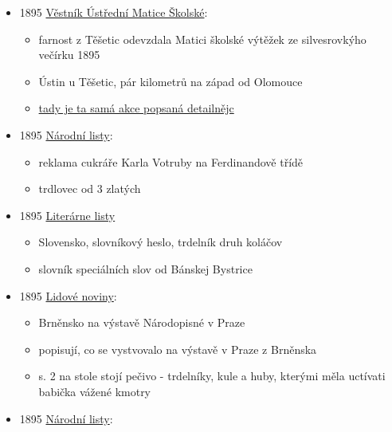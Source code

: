 \begin{itemize}
  \begin{itemize}
  \tightlist
  \item
    národopisná výstava v Dačicích, selská rožeň a trdelníky mezi
    vybavením kuchyně v selský světnici
  \end{itemize}
\item
  1895
  \href{https://ndk.cz/view/uuid:77d41380-a2e4-11e7-a093-005056825209?page=uuid\%3A9cb54070-a343-11e7-a093-005056825209&fulltext=trdeln\%C3\%ADk}{Věstník
  Ústřední Matice Školské}:

  \begin{itemize}
  \tightlist
  \item
    farnost z Těšetic odevzdala Matici školské výtěžek ze silvesrovkýho
    večírku 1895
  \item
    Ústin u Těšetic, pár kilometrů na západ od Olomouce
  \item
    \href{https://ndk.cz/view/uuid:eb8e3d99-435d-11dd-b505-00145e5790ea?page=uuid\%3A04295899-610e-49f5-b5b3-35f73d41b05d&fulltext=trdeln\%C3\%ADk}{tady
    je ta samá akce popsaná detailnějc}
  \end{itemize}
\item
  1895
  \href{https://ceskadigitalniknihovna.cz/uuid/uuid:6ef09ed4-435f-11dd-b505-00145e5790ea}{Národní
  listy}:

  \begin{itemize}
  \tightlist
  \item
    reklama cukráře Karla Votruby na Ferdinandově třídě
  \item
    trdlovec od 3 zlatých
  \end{itemize}
\item
  1895
  \href{https://dikda.snk.sk/uuid/uuid:dde694e6-6191-4983-bed1-e6328f0c9bf4}{Literárne
  listy}

  \begin{itemize}
  \tightlist
  \item
    Slovensko, slovníkový heslo, trdelník druh koláčov
  \item
    slovník speciálních slov od Bánskej Bystrice
  \end{itemize}
\item
  1895
  \href{https://ceskadigitalniknihovna.cz/uuid/uuid:22933190-6ef8-11ed-a5ba-005056827e51}{Lidové
  noviny}:

  \begin{itemize}
  \tightlist
  \item
    Brněnsko na výstavě Národopisné v Praze
  \item
    popisují, co se vystvovalo na výstavě v Praze z Brněnska
  \item
    s. 2 na stole stojí pečivo - trdelníky, kule a huby, kterými měla
    uctívati babička vážené kmotry
  \end{itemize}
\item
  1895
  \href{https://ceskadigitalniknihovna.cz/uuid/uuid:f392b3ef-435d-11dd-b505-00145e5790ea}{Národní
  listy}:


\end{itemize}

